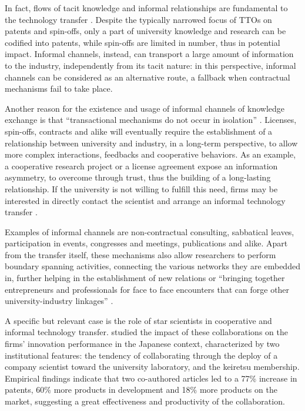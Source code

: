 In fact, flows of tacit knowledge and informal relationships are fundamental to the technology transfer \citep{Geuna2009}. Despite the typically narrowed focus of TTOs on patents and spin-offs, only a part of university knowledge and research can be codified into patents, while spin-offs are limited in number, thus in potential impact. Informal channels, instead, can transport a large amount of information to the industry, independently from its tacit nature: in this perspective, informal channels can be considered as an alternative route, a fallback when contractual mechanisms fail to take place.

Another reason for the existence and usage of informal channels of knowledge exchange is that \enquote{transactional mechanisms do not occur in isolation} \citep{Bercovitz2006}. Licenses, spin-offs, contracts and alike will eventually require the establishment of a relationship between university and industry, in a long-term perspective, to allow more complex interactions, feedbacks and cooperative behaviors. As an example, a cooperative research project or a license agreement expose an information asymmetry, to overcome through trust, thus the building of a long-lasting relationship. If the university is not willing to fulfill this need, firms may be interested in directly contact the scientist and arrange an informal technology transfer \citep{Siegel2003a, Link2007}. 

Examples of informal channels are non-contractual consulting, sabbatical leaves, participation in events, congresses and meetings, publications and alike. Apart from the transfer itself, these mechanisms also allow researchers to perform boundary spanning activities, connecting the various networks they are embedded in, further helping in the establishment of new relations or \enquote{bringing together entrepreneurs and professionals for face to face encounters that can forge other university-industry linkages} \citep{Yusuf2008}.

A specific but relevant case is the role of star scientists in cooperative and informal technology transfer. \citet{Zucker2001} studied the impact of these collaborations on the firms' innovation performance in the Japanese context, characterized by two institutional features: the tendency of collaborating through the deploy of a company scientist toward the university laboratory, and the keiretsu membership. Empirical findings indicate that two co-authored articles led to a 77\% increase in patents, 60\% more products in development and 18\% more products on the market, suggesting a great effectiveness and productivity of the collaboration.

